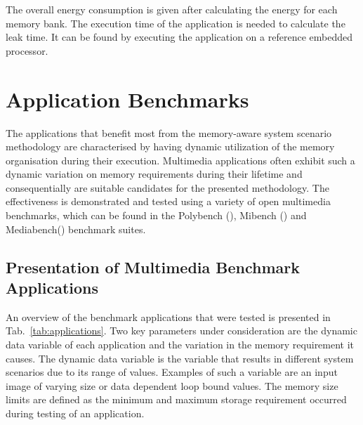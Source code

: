 \documentclass[a4paper,conference]{IEEEtran}
\begin{document}
 The overall energy consumption is given after calculating the energy for each memory bank. The execution time of the application is needed to calculate the leak time. It can be found by executing the application on a reference embedded processor.   
 
\section{Application Benchmarks}
\label{sec:applications}

The applications that benefit most from the memory-aware system scenario methodology are characterised by having dynamic utilization of the memory organisation during their execution. Multimedia applications often exhibit such a dynamic variation on memory requirements during their lifetime and consequentially are suitable candidates for the presented methodology. The effectiveness is demonstrated and tested using a variety of open multimedia benchmarks, which can be found in the Polybench (\cite{Poly}), Mibench (\cite{mibench}) and Mediabench(\cite{mediabench}) benchmark suites. 

\subsection{Presentation of Multimedia Benchmark Applications}

An overview of the benchmark applications that were tested is presented in Tab.~\ref{tab:applications}. Two key parameters under consideration are the dynamic data variable of each application and the variation in the memory requirement it causes. The dynamic data variable is the variable that results in different system scenarios due to its range of values. Examples of such a variable are an input image of varying size or data dependent loop bound values. The memory size limits are defined as the minimum and maximum storage requirement occurred during testing of an application.
\end{document}
